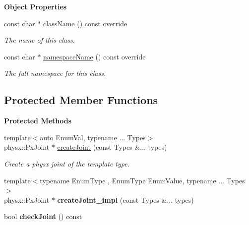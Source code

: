 \begin{Indent}\textbf{ Object Properties}\par
\begin{DoxyCompactItemize}
\item 
const char $\ast$ \mbox{\hyperlink{classrev_1_1_physics_joint_aef7f21c8a657ce02326b965af8835517}{class\+Name}} () const override
\begin{DoxyCompactList}\small\item\em The name of this class. \end{DoxyCompactList}\item 
const char $\ast$ \mbox{\hyperlink{classrev_1_1_physics_joint_a312be29fc0f85bacb01952c63e985096}{namespace\+Name}} () const override
\begin{DoxyCompactList}\small\item\em The full namespace for this class. \end{DoxyCompactList}\end{DoxyCompactItemize}
\end{Indent}
\subsection*{Protected Member Functions}
\begin{Indent}\textbf{ Protected Methods}\par
\begin{DoxyCompactItemize}
\item 
{\footnotesize template$<$auto Enum\+Val, typename ... Types$>$ }\\physx\+::\+Px\+Joint $\ast$ \mbox{\hyperlink{classrev_1_1_physics_joint_a2af8aa1362fb5b278518b5502d37145b}{create\+Joint}} (const Types \&... types)
\begin{DoxyCompactList}\small\item\em Create a physx joint of the template type. \end{DoxyCompactList}\item 
\mbox{\label{classrev_1_1_physics_joint_a8fa70ffe594aa4b76d51660c33d96123}} 
{\footnotesize template$<$typename Enum\+Type , Enum\+Type Enum\+Value, typename ... Types$>$ }\\physx\+::\+Px\+Joint $\ast$ {\bfseries create\+Joint\+\_\+impl} (const Types \&... types)
\item 
\mbox{\label{classrev_1_1_physics_joint_a41453e88af13b59082afb0c03bd18854}} 
bool {\bfseries check\+Joint} () const
\end{DoxyCompactItemize}
\end{Indent}
